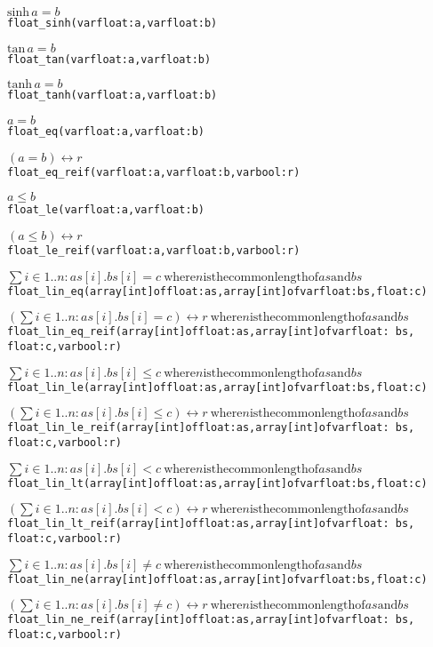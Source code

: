 \documentclass[a4paper]{article}
\begin{document}
\begin{alltt}
\(\mathrm{sinh}\, a = b\)
float_sinh(var float: a, var float: b)

\(\mathrm{tan}\, a = b\)
float_tan(var float: a, var float: b)

\(\mathrm{tanh}\, a = b\)
float_tanh(var float: a, var float: b)

\(a = b\)
float_eq(var float: a, var float: b)

\((a = b) \leftrightarrow r\)
float_eq_reif(var float: a, var float: b, var bool: r)

\(a \leq b\)
float_le(var float: a, var float: b)

\((a \leq b) \leftrightarrow r\)
float_le_reif(var float: a, var float: b, var bool: r)

\(\sum i\in{}1..n: as[i].bs[i] = c\
\mathrm{ where} n \mathrm{is the common length of} as \mathrm{and} bs\)
float_lin_eq(array [int] of float: as, array [int] of var float: bs, float: c)

\((\sum i\in{}1..n: as[i].bs[i] = c) \leftrightarrow r\
\mathrm{ where} n \mathrm{is the common length of} as \mathrm{and} bs\)
float_lin_eq_reif(array [int] of float: as, array [int] of var float: \
bs,
    float: c, var bool: r)

\(\sum i\in{}1..n: as[i].bs[i] \leq c\
\mathrm{ where} n \mathrm{is the common length of} as \mathrm{and} bs\)
float_lin_le(array [int] of float: as, array [int] of var float: bs, float: c)

\((\sum i\in{}1..n: as[i].bs[i] \leq c) \leftrightarrow r\
\mathrm{ where} n \mathrm{is the common length of} as \mathrm{and} bs\)
float_lin_le_reif(array [int] of float: as, array [int] of var float: \
bs,
    float: c, var bool: r)

\(\sum i\in{}1..n: as[i].bs[i] < c\
\mathrm{ where} n \mathrm{is the common length of} as \mathrm{and} bs\)
float_lin_lt(array [int] of float: as, array [int] of var float: bs, float: c)

\((\sum i\in{}1..n: as[i].bs[i] < c) \leftrightarrow r\
\mathrm{ where} n \mathrm{is the common length of} as \mathrm{and} bs\)
float_lin_lt_reif(array [int] of float: as, array [int] of var float: \
bs,
    float: c, var bool: r)

\(\sum i\in{}1..n: as[i].bs[i] \neq c\
\mathrm{ where} n \mathrm{is the common length of} as \mathrm{and} bs\)
float_lin_ne(array [int] of float: as, array [int] of var float: bs, float: c)

\((\sum i\in{}1..n: as[i].bs[i] \neq c) \leftrightarrow r\
\mathrm{ where} n \mathrm{is the common length of} as \mathrm{and} bs\)
float_lin_ne_reif(array [int] of float: as, array [int] of var float: \
bs,
    float: c, var bool: r)


\end{alltt}
\end{document}
